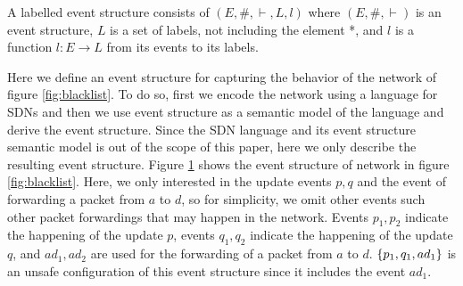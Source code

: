 \begin{definition}
    A labelled event structure consists of $(E,\#,\vdash,L,l)$ where
    $(E,\#,\vdash)$ is an event structure, $L$ is a set of labels,
    not including the element *, and $l$ is a function $l: E \rightarrow L$
    from its events to its labels.
\end{definition}
\begin{example}
    Here we define an event structure for capturing the 
    behavior of the network of figure \ref{fig:blacklist}.
    To do so, first we encode the network using a language for SDNs and 
    then we use event structure as a semantic model of the language 
    and derive the event structure.
    Since the SDN language and its event structure semantic model
    is out of the scope of this paper, here we only describe the 
    resulting event structure.
    Figure \ref{fig:blacklist:es} shows the event structure of network
    in figure \ref{fig:blacklist}.
    Here, we only interested in the update events $p,q$ and the event
    of forwarding a packet from $a$ to $d$, so for simplicity, we omit 
    other events such other packet forwardings that may happen in 
    the network.
    Events $p_1,p_2$ indicate the happening of the update $p$,
    events $q_1,q_2$ indicate the happening of the update $q$,
    and $ad_1,ad_2$ are used for the forwarding of a packet from 
    $a$ to $d$.
    $\{p_1,q_1,ad_1\}$ is an unsafe configuration of this event structure since it includes the event $ad_1$.

    \begin{figure}
        \centering
        \caption{}
        \label{fig:blacklist:es}
    \end{figure}
\end{example}

